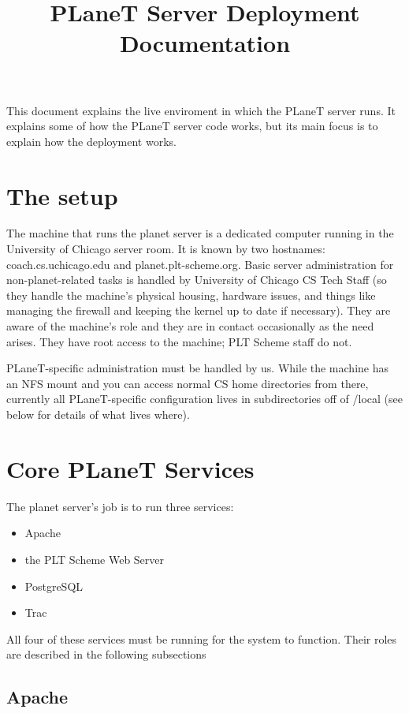 \documentclass{article}
\title{PLaneT Server Deployment Documentation}
\begin{document}
\maketitle

This document explains the live enviroment in which the PLaneT server
runs. It explains some of how the PLaneT server code works, but its
main focus is to explain how the deployment works.

\section{The setup}

The machine that runs the planet server is a dedicated computer
running in the University of Chicago server room. It is known by two
hostnames: coach.cs.uchicago.edu and planet.plt-scheme.org. Basic
server administration for non-planet-related tasks is handled by
University of Chicago CS Tech Staff (so they handle the machine's
physical housing, hardware issues, and things like managing the
firewall and keeping the kernel up to date if necessary). They are
aware of the machine's role and they are in contact occasionally as
the need arises. They have root access to the machine; PLT Scheme
staff do not.

PLaneT-specific administration must be handled by us. While the
machine has an NFS mount and you can access normal CS home directories
from there, currently all PLaneT-specific configuration lives in
subdirectories off of /local (see below for details of what lives where).

\section{Core PLaneT Services}

The planet server's job is to run three services:
\begin{itemize}
\item Apache
\item the PLT Scheme Web Server
\item PostgreSQL
\item Trac
\end{itemize}

All four of these services must be running for the system to
function. Their roles are described in the following subsections

\subsection{Apache}
\end{document}
